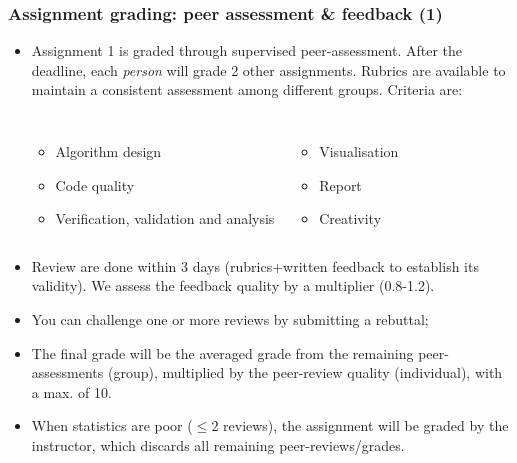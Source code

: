 \begin{frame}
  \frametitle{Assignment grading: peer assessment \& feedback (1)}
  \begin{itemize}
    \item Assignment 1 is graded through supervised peer-assessment. After the deadline, each \emph{person} will grade 2 other assignments. Rubrics are available to maintain a consistent assessment among different groups. Criteria are:\hfill
      \begin{columns}
          \begin{itemize}
            \item Algorithm design
            \item Code quality
            \item Verification, validation and analysis
          \end{itemize}
          \begin{itemize}
            \item Visualisation
            \item Report
            \item Creativity
          \end{itemize}
      \end{columns}
    \item Review are done within 3 days (rubrics+written feedback to establish its validity). We assess the feedback quality by a multiplier (0.8-1.2).
    \item You can challenge one or more reviews by submitting a rebuttal;
    \item The final grade will be the averaged grade from the remaining peer-assessments (group), multiplied by the peer-review quality (individual), with a max. of 10.
    \item When statistics are poor ($\leq 2$ reviews), the assignment will be graded by the instructor, which discards all remaining peer-reviews/grades.
  \end{itemize}
\end{frame}

